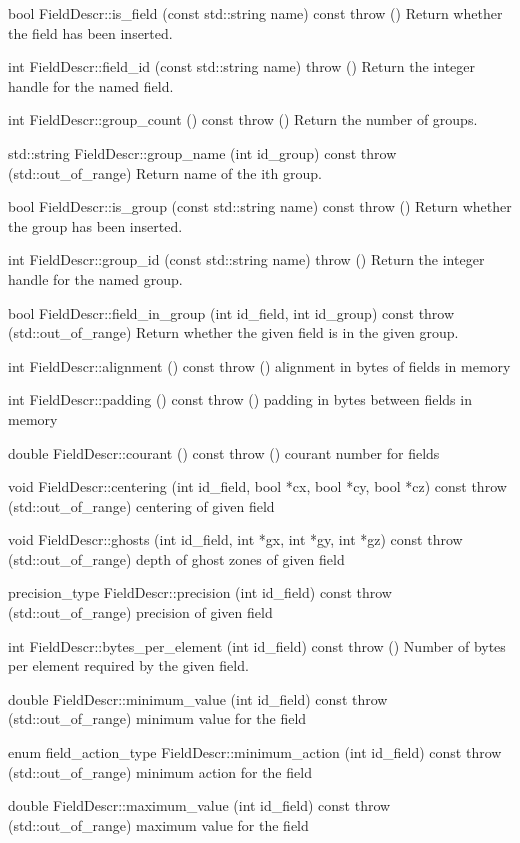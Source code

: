 \documentclass{article}
\begin{document}
bool 	FieldDescr::is\_field (const std::string name) const throw ()
 	Return whether the field has been inserted.

int 	FieldDescr::field\_id (const std::string name) throw ()
 	Return the integer handle for the named field.

int 	FieldDescr::group\_count () const throw ()
 	Return the number of groups.

std::string 	FieldDescr::group\_name (int id\_group) const throw (std::out\_of\_range)
 	Return name of the ith group.

bool 	FieldDescr::is\_group (const std::string name) const throw ()
 	Return whether the group has been inserted.

int 	FieldDescr::group\_id (const std::string name) throw ()
 	Return the integer handle for the named group.

bool 	FieldDescr::field\_in\_group (int id\_field, int id\_group) const throw (std::out\_of\_range)
 	Return whether the given field is in the given group.

int 	FieldDescr::alignment () const throw ()
 	alignment in bytes of fields in memory

int 	FieldDescr::padding () const throw ()
 	padding in bytes between fields in memory

double 	FieldDescr::courant () const throw ()
 	courant number for fields

void 	FieldDescr::centering (int id\_field, bool *cx, bool *cy, bool *cz) const throw (std::out\_of\_range)
 	centering of given field

void 	FieldDescr::ghosts (int id\_field, int *gx, int *gy, int *gz) const throw (std::out\_of\_range)
 	depth of ghost zones of given field

precision\_type 	FieldDescr::precision (int id\_field) const throw (std::out\_of\_range)
 	precision of given field

int 	FieldDescr::bytes\_per\_element (int id\_field) const throw ()
 	Number of bytes per element required by the given field.

double 	FieldDescr::minimum\_value (int id\_field) const throw (std::out\_of\_range)
 	minimum value for the field

enum field\_action\_type 	FieldDescr::minimum\_action (int id\_field) const throw (std::out\_of\_range)
 	minimum action for the field

double 	FieldDescr::maximum\_value (int id\_field) const throw (std::out\_of\_range)
 	maximum value for the field
\end{document}
